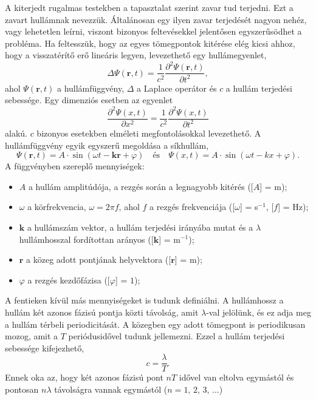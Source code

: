 \documentclass[a4paper,12pt]{article}
\newcommand{\V}[1]{\mathbf{#1}}
\begin{document}
A kiterjedt rugalmas testekben a tapasztalat szerint zavar tud terjedni. Ezt a zavart hullámnak nevezzük. Általánosan egy ilyen zavar terjedését nagyon nehéz, vagy lehetetlen leírni, viszont bizonyos feltevésekkel jelentősen egyszerűsödhet a probléma. Ha feltesszük, hogy az egyes tömegpontok kitérése elég kicsi ahhoz, hogy a visszatérítő erő lineáris legyen, levezethető egy hullámegyenlet,
\begin{equation}
\Delta \Psi(\V{r}, t) = \frac{1}{c^2} \frac{\partial^2 \Psi(\V{r}, t)}{\partial t^2},
\label{hullamegyenlet-3D}
\end{equation}
ahol $\Psi(\V{r}, t)$ a hullámfüggvény, $\Delta$ a Laplace operátor és $c$ a hullám terjedési sebessége. Egy dimenziós esetben az egyenlet
\begin{equation}
\frac{\partial^2 \Psi(x, t)}{\partial x^2} = \frac{1}{c^2} \frac{\partial^2 \Psi(x, t)}{\partial t^2}
\label{hullamegyenlet-1D}
\end{equation}
alakú. $c$ bizonyos esetekben elméleti megfontolásokkal levezethető. A hullámfüggvény egyik egyszerű megoldása a síkhullám,
$$ \Psi (\V{r}, t) = A \cdot \sin (\omega t - \V{k} \V{r} + \varphi) \quad \text{és} \quad \Psi(x, t) = A \cdot \sin(\omega t - k x + \varphi). $$
A függvényben szereplő mennyiségek:
\begin{itemize}
\item $A$ a hullám amplitúdója, a rezgés során a legnagyobb kitérés ([$A$] = m);
\item $\omega$ a körfrekvencia, $\omega = 2 \pi f$, ahol $f$ a rezgés frekvenciája ([$\omega$] = s$^{-1}$, [$f$] = Hz);
\item $\V{k}$ a hullámszám vektor, a hullám terjedési irányába mutat és a $\lambda$ hullámhosszal fordítottan arányos ([$\V{k}$] = m$^{-1}$);
\item $\V{r}$ a közeg adott pontjának helyvektora ([$\V{r}$] = m);
\item $\varphi$ a rezgés kezdőfázisa ([$\varphi$] = $1$);
\end{itemize}

A fentieken kívül más mennyiségeket is tudunk definiálni. A hullámhossz a hullám két azonos fázisú pontja közti távolság, amit $\lambda$-val jelölünk, és ez adja meg a hullám térbeli periodicitását. A közegben egy adott tömegpont is periodikusan mozog, amit a $T$ periódusidővel tudunk jellemezni. Ezzel a hullám terjedési sebessége kifejezhető,
$$ c=\frac{\lambda}{T}. $$
Ennek oka az, hogy két azonos fázisú pont $n T$ idővel van eltolva egymástól és pontosan $n \lambda$ távolságra vannak egymástól ($n = \text{1, 2, 3, ...}$)
\end{document}
